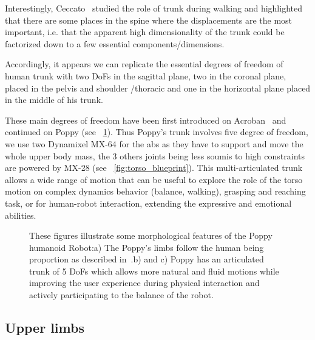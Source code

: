 Interestingly, Ceccato~\parencite{ceccatoPlos09} studied the role of trunk during walking and highlighted that there are some places in the spine where the displacements are the most important, i.e. that the apparent high dimensionality of the trunk could be factorized down to a few essential components/dimensions.

Accordingly, it appears we can replicate the essential degrees of freedom of human trunk with two DoFs in the sagittal plane, two in the coronal plane, placed in the pelvis and shoulder /thoracic and one in the horizontal plane placed in the middle of his trunk.

These main degrees of freedom have been first introduced on Acroban~\parencite{Ly2011bio} and continued on Poppy (see \figurename~\ref{fig:poppy_torso}).
Thus Poppy's trunk involves five degree of freedom, we use two Dynamixel MX-64 for the abs as they have to support and move the whole upper body mass, the 3 others joints being less soumis to high constraints are powered by MX-28 (see \figurename~\ref{fig:torso_blueprint}). This multi-articulated trunk allows a wide range of motion that can be useful to explore the role of the torso motion on complex dynamics behavior (balance, walking), grasping and reaching task, or for human-robot interaction, extending the expressive and emotional abilities.

\begin{figure}[p]
\centering


    \hfil
    \caption{These figures illustrate some morphological features of the Poppy humanoid Robot:\newline a) The Poppy's limbs follow the human being proportion as described in~\parencite{dufour2005biomecanique}.\newline b) and c) Poppy has an articulated trunk of 5 DoFs which allows more natural and fluid motions while improving the user experience during physical interaction and actively participating to the balance of the robot.}
    \label{fig:poppy_torso}
\end{figure}



\subsection{Upper limbs} %

